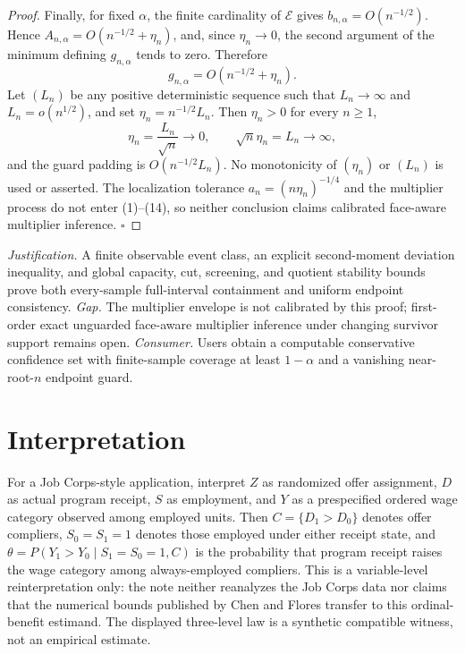 \documentclass{article}
\begin{document}
\begin{proof}
Finally, for fixed \(\alpha\), the finite cardinality of \(\mathcal E\) gives \(b_{n,\alpha}=O(n^{-1/2})\).  Hence \(A_{n,\alpha}=O(n^{-1/2}+\eta_n)\), and, since \(\eta_n\to0\), the second argument of the minimum defining \(g_{n,\alpha}\) tends to zero.  Therefore
\[
g_{n,\alpha}=O(n^{-1/2}+\eta_n).
\]
Let \((L_n)\) be any positive deterministic sequence such that \(L_n\to\infty\) and \(L_n=o(n^{1/2})\), and set \(\eta_n=n^{-1/2}L_n\).  Then \(\eta_n>0\) for every \(n\ge1\),
\[
\eta_n=\frac{L_n}{\sqrt n}\longrightarrow0,
\qquad
\sqrt n\eta_n=L_n\longrightarrow\infty,
\]
and the guard padding is \(O(n^{-1/2}L_n)\).  No monotonicity of \((\eta_n)\) or \((L_n)\) is used or asserted.  The localization tolerance \(a_n=(n\eta_n)^{-1/4}\) and the multiplier process do not enter (1)--(14), so neither conclusion claims calibrated face-aware multiplier inference. \(\square\)
\end{proof}
\par\smallskip\noindent \textit{Justification.} A finite observable event class, an explicit second-moment deviation inequality, and global capacity, cut, screening, and quotient stability bounds prove both every-sample full-interval containment and uniform endpoint consistency. \textit{Gap.} The multiplier envelope is not calibrated by this proof; first-order exact unguarded face-aware multiplier inference under changing survivor support remains open. \textit{Consumer.} Users obtain a computable conservative confidence set with finite-sample coverage at least \(1-\alpha\) and a vanishing near-root-\(n\) endpoint guard.

\section{Interpretation}

For a Job Corps-style application, interpret \(Z\) as randomized offer assignment, \(D\) as actual program receipt, \(S\) as employment, and \(Y\) as a prespecified ordered wage category observed among employed units. Then \(C=\{D_1>D_0\}\) denotes offer compliers, \(S_0=S_1=1\) denotes those employed under either receipt state, and \(\theta=P(Y_1>Y_0\mid S_1=S_0=1,C)\) is the probability that program receipt raises the wage category among always-employed compliers. This is a variable-level reinterpretation only: the note neither reanalyzes the Job Corps data nor claims that the numerical bounds published by Chen and Flores transfer to this ordinal-benefit estimand. The displayed three-level law is a synthetic compatible witness, not an empirical estimate.
\end{document}
